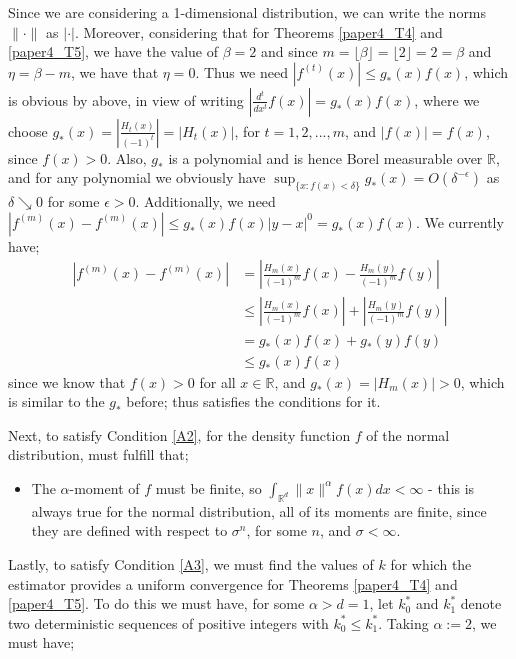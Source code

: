 \documentclass{report}
\begin{document}
\begin{itemize}
Since we are considering a 1-dimensional distribution, we can write the norms $\| \cdotp \|$ as  $| \cdotp |$. Moreover, considering that for Theorems \ref{paper4_T4} and \ref{paper4_T5}, we have the value of $\beta =2$ and since $m = \lfloor \beta \rfloor =  \lfloor 2 \rfloor = 2 = \beta$ and $\eta = \beta -m$, we have that $\eta =0$. Thus we need  $|f^{(t)}(x)| \leq g_{*}(x) f(x)$, which is obvious by above, in view of writing $|\frac{d^t}{dx^t} f(x)| = g_{*}(x) f(x)$, where we choose $ g_{*}(x) = |\frac{H_{t}(x)}{(-1)^t}| = |H_{t}(x)|$, for $t=1,2,...,m$, and $|f(x)| = f(x)$, since $f(x) >0$. Also, $g_{*}$ is a polynomial and is hence Borel measurable over $\mathbb{R}$, and for any polynomial we obviously have $\sup_{\{x : f(x) < \delta\}} g_{*}(x) = O(\delta^{-\epsilon})$ as $\delta \searrow 0$ for some $\epsilon >0$. Additionally, we need $|f^{(m)}(x) - f^{(m)}(x)| \leq g_{*}(x) f(x)|y - x|^{0} = g_{*}(x) f(x)$. We currently have;
\begin{align*}
|f^{(m)}(x) - f^{(m)}(x)| &= \left| \frac{H_{m}(x)}{(-1)^m} f(x) - \frac{H_{m}(y)}{(-1)^m} f(y) \right| \\
&\leq \left| \frac{H_{m}(x)}{(-1)^m} f(x) \right| + \left| \frac{H_{m}(y)}{(-1)^m} f(y) \right| \\
&= g_{*}(x)f(x) + g_{*}(y)f(y) \\
&\leq g_{*}(x)f(x)
\end{align*}
since we know that $f(x) >0$ for all $x \in \mathbb{R}$, and $g_{*}(x) = |H_{m}(x)| >0$, which is similar to the $g_{*}$ before; thus satisfies the conditions for it.
\end{itemize}

Next, to satisfy Condition \ref{A2}, for the density function $f$ of the normal distribution, must fulfill that;
\begin{itemize}
\item The $\alpha$-moment of $f$ must be finite, so $\int_{\mathbb{R}^{d}} \| x \|^{\alpha} f(x) dx < \infty$ - this is always true for the normal distribution, all of its moments are finite, since they are defined with respect to $\sigma^n$, for some $n$, and $\sigma < \infty$.

\end{itemize}

Lastly, to satisfy Condition \ref{A3}, we must find the values of $k$ for which the estimator provides a uniform convergence for Theorems \ref{paper4_T4} and \ref{paper4_T5}. To do this we must have, for some $\alpha > d = 1$, let $k_{0}^{*}$ and $k_{1}^{*}$ denote two deterministic sequences of positive integers with $k_{0}^{*} \leq k_{1}^{*}$. Taking $\alpha := 2$, we must have;
\end{document}

